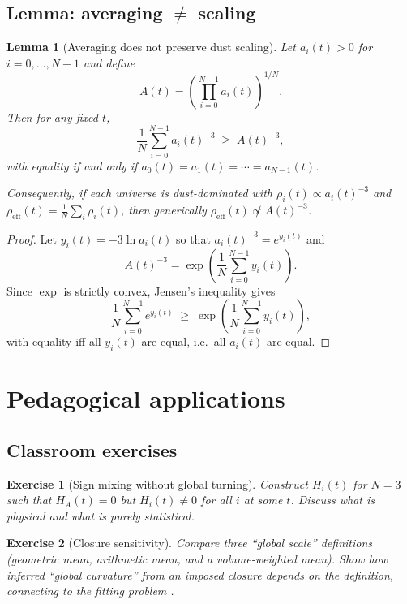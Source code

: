 \documentclass[11pt]{article}
\newtheorem{lemma}{Lemma}
\newtheorem{exercise}{Exercise}
\begin{document}
\subsection{Lemma: averaging $\neq$ scaling}

\begin{lemma}[Averaging does not preserve dust scaling]
Let $a_i(t)>0$ for $i=0,\dots,N-1$ and define
\[
A(t)=\left(\prod_{i=0}^{N-1} a_i(t)\right)^{1/N}.
\]
Then for any fixed $t$,
\[
\frac{1}{N}\sum_{i=0}^{N-1} a_i(t)^{-3}\;\ge\; A(t)^{-3},
\]
with equality if and only if $a_0(t)=a_1(t)=\cdots=a_{N-1}(t)$.

Consequently, if each universe is dust-dominated with $\rho_i(t)\propto a_i(t)^{-3}$ and
$\rho_{\mathrm{eff}}(t)=\frac{1}{N}\sum_i\rho_i(t)$, then generically
$\rho_{\mathrm{eff}}(t)\not\propto A(t)^{-3}$.
\end{lemma}

\begin{proof}
Let $y_i(t)=-3\ln a_i(t)$ so that $a_i(t)^{-3}=e^{y_i(t)}$ and
\[
A(t)^{-3}=\exp\!\left(\frac{1}{N}\sum_{i=0}^{N-1} y_i(t)\right).
\]
Since $\exp$ is strictly convex, Jensen's inequality gives
\[
\frac{1}{N}\sum_{i=0}^{N-1} e^{y_i(t)}
\;\ge\;
\exp\!\left(\frac{1}{N}\sum_{i=0}^{N-1} y_i(t)\right),
\]
with equality iff all $y_i(t)$ are equal, i.e.\ all $a_i(t)$ are equal.
\end{proof}

\section{Pedagogical applications}

\subsection{Classroom exercises}

\begin{exercise}[Sign mixing without global turning]
Construct $H_i(t)$ for $N=3$ such that $H_A(t)=0$ but $H_i(t)\neq 0$ for all $i$ at some $t$. Discuss what is physical and what is purely statistical.
\end{exercise}

\begin{exercise}[Closure sensitivity]
Compare three ``global scale'' definitions (geometric mean, arithmetic mean, and a volume-weighted mean). Show how inferred ``global curvature'' from an imposed closure depends on the definition, connecting to the fitting problem \citep{Buchert2000,ClarksonEtAl2011}.
\end{exercise}
\end{document}
